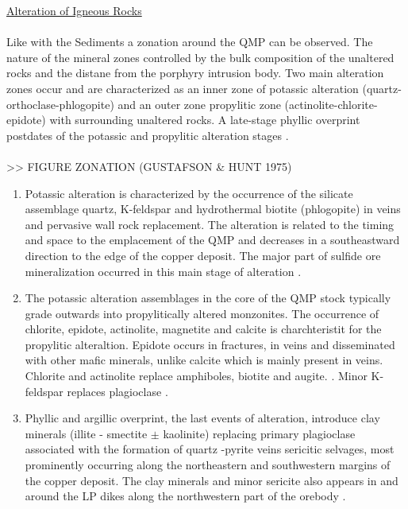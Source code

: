 \documentclass[a4paper,11pt,titlepage]{article}
\begin{document}
\noindent\underline{Alteration of Igneous Rocks}
\\
\\ Like with the  Sediments a zonation around the QMP can be observed. The nature of the mineral zones controlled by the bulk composition of the unaltered rocks and the distane from the porphyry intrusion body. Two main alteration zones occur and are characterized as an inner zone of potassic alteration (quartz-orthoclase-phlogopite) and an outer zone propylitic zone (actinolite-chlorite-epidote) with surrounding unaltered rocks. A late-stage phyllic overprint postdates of the potassic and propylitic alteration stages \citep{Bray1969,Lanier1978,Babcock1995}.
\\
\\ >> FIGURE ZONATION (GUSTAFSON \& HUNT 1975)
\\\begin{enumerate}[resume]
\item Potassic alteration  is characterized by the occurrence of the silicate assemblage quartz, K-feldspar and hydrothermal biotite (phlogopite) in veins and pervasive wall rock replacement. The alteration is related to the timing and space to the emplacement of the QMP and decreases in a southeastward direction to the edge of the copper deposit. The major part of sulfide ore mineralization occurred in this main stage of alteration \citep{Babcock1995}.
\item The potassic alteration assemblages in the core of the QMP stock typically grade outwards into propylitically altered monzonites. The occurrence of chlorite, epidote, actinolite, magnetite and calcite is charchteristit for the propylitic alteraltion. Epidote occurs in fractures, in veins and disseminated with other mafic minerals, unlike calcite which is mainly present in veins. Chlorite and actinolite replace amphiboles, biotite and augite. \citep{Landtwing2004}. Minor K-feldspar replaces plagioclase \citep{Babcock1995}.
\item Phyllic and argillic overprint, the last events of alteration, introduce clay minerals (illite - smectite $\pm$ kaolinite) replacing primary plagioclase associated with the formation of quartz -pyrite veins sericitic selvages, most prominently occurring along the northeastern and southwestern margins of the copper deposit. The clay minerals and minor sericite also appears in and around the LP dikes along the northwestern part of the orebody \citep{Landtwing2004}.
\end{enumerate}
\end{document}
